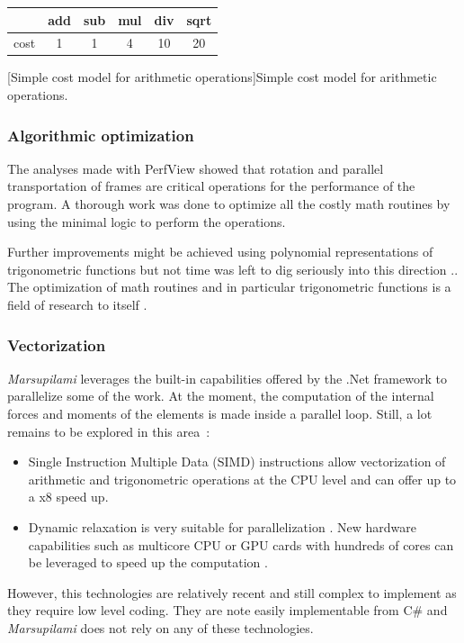 \begin{table}[!b]
\center
	\begin{tabularx}{0.4\textwidth}{@{} X ccccc @{}}
		\toprule
		 	& add 	& sub 	& mul 	& div 	& sqrt \\
		\midrule
		cost	& 1 		& 1 		& 4 		& 10 		& 20	\\
		\bottomrule	
	\end{tabularx}
	\label{tab:count}
	\vspace{10pt}
	[Simple cost model for arithmetic operations]{Simple cost model for arithmetic operations.}
	\label{tab:costmodel}
\end{table}

\subsubsection{Algorithmic optimization}
The analyses made with PerfView showed that rotation and parallel transportation of frames are critical operations for the performance of the program. A thorough work was done to optimize all the costly math routines by using the minimal logic to perform the operations.

Further improvements might be achieved using polynomial representations of trigonometric functions but not time was left to dig seriously into this direction \cite{Trefethen2007,Chevillard2010}.\cite{Green2003}. The optimization of math routines and in particular trigonometric functions is a field of research to itself \cite{Green2003}.

\subsubsection{Vectorization}
\emph{Marsupilami} leverages the built-in capabilities offered by the .Net framework to parallelize some of the work. At the moment, the computation of the internal forces and moments of the elements is made inside a parallel loop. Still, a lot remains to be explored in this area~:
\begin{itemize}
\item Single Instruction Multiple Data (SIMD) instructions allow vectorization of arithmetic and trigonometric operations at the CPU level and can offer up to a x8 speed up.
\item Dynamic relaxation is very suitable for parallelization \cite{Topping1994}. New hardware capabilities such as multicore CPU or GPU cards with hundreds of cores can be leveraged to speed up the computation \cite{Rek2016,Liew2016}.
\end{itemize}
However, this technologies are relatively recent and still complex to implement as they require low level coding. They are note easily implementable from C\# and \emph{Marsupilami} does not rely on any of these technologies.

